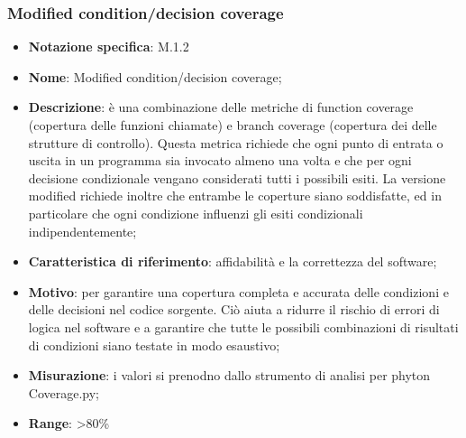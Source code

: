\subsubsection{Modified condition/decision coverage}
\begin{itemize}
    \item \textbf{Notazione specifica}: M.1.2
    \item \textbf{Nome}: Modified condition/decision coverage;
    \item \textbf{Descrizione}: è una combinazione delle metriche di function coverage (copertura delle funzioni chiamate) e branch coverage (copertura dei  delle strutture di controllo). Questa metrica richiede che ogni punto di entrata o uscita in un programma sia invocato almeno una volta e che per ogni decisione condizionale vengano considerati tutti i possibili esiti. La versione modified richiede inoltre che entrambe le coperture siano soddisfatte, ed in particolare che ogni condizione influenzi gli esiti condizionali indipendentemente;
    \item \textbf{Caratteristica di riferimento}: affidabilità e la correttezza del software;
    \item \textbf{Motivo}: per garantire una copertura completa e accurata delle condizioni e delle decisioni nel codice sorgente. Ciò aiuta a ridurre il rischio di errori di logica nel software e a garantire che tutte le possibili combinazioni di risultati di condizioni siano testate in modo esaustivo;
    \item \textbf{Misurazione}: i valori si prenodno dallo strumento di analisi per phyton Coverage.py;
    \item \textbf{Range}: >80\%
\end{itemize}